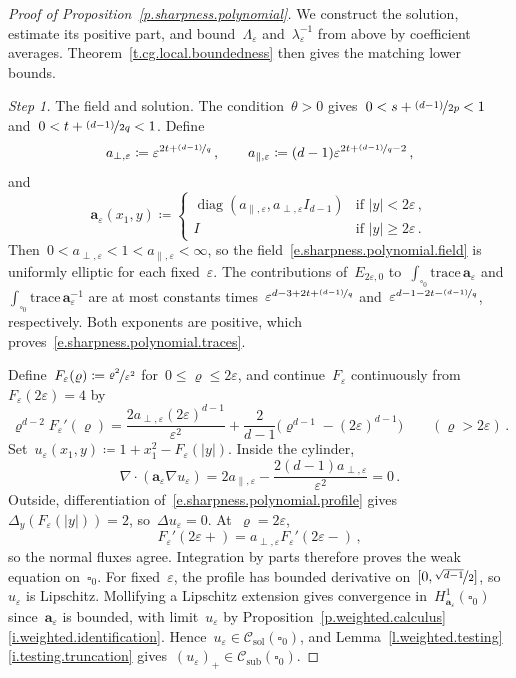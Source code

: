 \documentclass[11pt,letterpaper]{article}
\numberwithin{equation}{section}
\theoremstyle{definition}
\renewcommand{\a}{\mathbf{a}}
\newcommand{\eps}{\varepsilon}
\newcommand{\nf}{\nicefrac}
\newcommand{\cu}{\square}
\newcommand*{\tr}{\mathrm{trace\,}}
\newcommand{\Csol}{\mathcal C_{\mathrm{sol}}}
\newcommand{\Csub}{\mathcal C_{\mathrm{sub}}}
\begin{document}
\begin{proof}[Proof of Proposition~\ref{p.sharpness.polynomial}]
We construct the solution, estimate its positive part, and bound~$\Lambda_\eps$ and~$\lambda_\eps^{-1}$ from above by coefficient averages. Theorem~\ref{t.cg.local.boundedness} then gives the matching lower bounds.

\smallskip
\emph{Step 1.} The field and solution. The condition~$\theta>0$ gives~$0<s+\nf{(d-1)}{2p}<1$ and~$0<t+\nf{(d-1)}{2q}<1$. Define
\begin{equation*}
	a_{\perp,\eps}\coloneqq\eps^{2t+\nf{(d-1)}q}\,,\qquad a_{\parallel,\eps}\coloneqq(d-1)\eps^{2t+\nf{(d-1)}q-2}\,,
\end{equation*}
and
\begin{equation}
	\a_\eps(x_1,y)\coloneqq\begin{cases}\operatorname{diag}(a_{\parallel,\eps},a_{\perp,\eps}I_{d-1})&\mbox{if }|y|<2\eps\,,\\I&\mbox{if }|y|\geq2\eps\,.\end{cases}
	\label{e.sharpness.polynomial.field}
\end{equation}
Then~$0<a_{\perp,\eps}<1<a_{\parallel,\eps}<\infty$, so the field~\eqref{e.sharpness.polynomial.field} is uniformly elliptic for each fixed~$\eps$. The contributions of~$E_{2\eps,0}$ to~$\int_{\cu_0}\tr\a_\eps$ and~$\int_{\cu_0}\tr\a_\eps^{-1}$ are at most constants times~$\eps^{d-3+2t+\nf{(d-1)}q}$ and~$\eps^{d-1-2t-\nf{(d-1)}q}$, respectively. Both exponents are positive, which proves~\eqref{e.sharpness.polynomial.traces}.

\smallskip
Define~$F_\eps(\varrho)\coloneqq\nf{\varrho^2}{\eps^2}$ for~$0\leq \varrho\leq2\eps$, and continue~$F_\eps$ continuously from~$F_\eps(2\eps)=4$ by
\begin{equation}
	\varrho^{d-2}F_\eps'(\varrho)=\frac{2a_{\perp,\eps}(2\eps)^{d-1}}{\eps^2}+\frac2{d-1}\bigl(\varrho^{d-1}-(2\eps)^{d-1}\bigr)\qquad(\varrho>2\eps)\,.
	\label{e.sharpness.polynomial.profile}
\end{equation}
Set~$u_\eps(x_1,y)\coloneqq1+x_1^2-F_\eps(|y|)$. Inside the cylinder,
\begin{equation*}
	\nabla\cdot(\a_\eps\nabla u_\eps)=2a_{\parallel,\eps}-\frac{2(d-1)a_{\perp,\eps}}{\eps^2}=0\,.
\end{equation*}
Outside, differentiation of~\eqref{e.sharpness.polynomial.profile} gives~$\Delta_y(F_\eps(|y|))=2$, so~$\Delta u_\eps=0$. At~$\varrho=2\eps$,
\begin{equation*}
	F_\eps'(2\eps+)=a_{\perp,\eps}F_\eps'(2\eps-)\,,
\end{equation*}
so the normal fluxes agree. Integration by parts therefore proves the weak equation on~$\cu_0$. For fixed~$\eps$, the profile has bounded derivative on~$[0,\nf{\sqrt{d-1}}2]$, so~$u_\eps$ is Lipschitz. Mollifying a Lipschitz extension gives convergence in~$H^1_{\a_\eps}(\cu_0)$ since~$\a_\eps$ is bounded, with limit~$u_\eps$ by Proposition~\ref{p.weighted.calculus}\ref{i.weighted.identification}. Hence~$u_\eps\in\Csol(\cu_0)$, and Lemma~\ref{l.weighted.testing}\ref{i.testing.truncation} gives~$(u_\eps)_+\in\Csub(\cu_0)$.


\end{proof}
\end{document}

